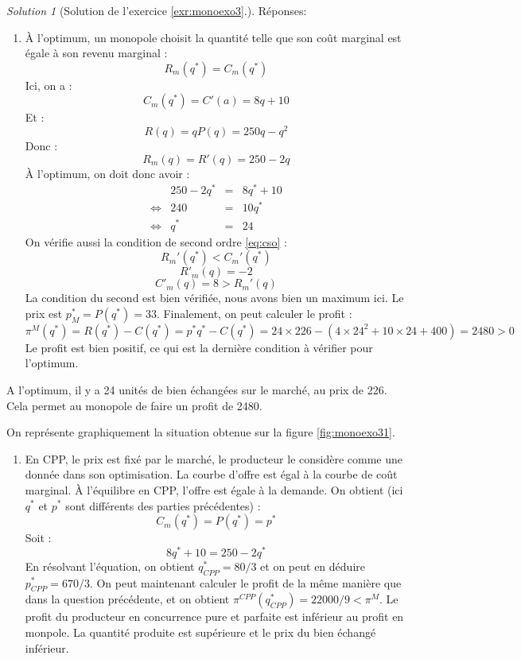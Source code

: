 \documentclass[
]{book}
\providecommand{\tightlist}{%
  \setlength{\itemsep}{0pt}\setlength{\parskip}{0pt}}
\theoremstyle{definition}
\theoremstyle{definition}
\theoremstyle{definition}
\theoremstyle{definition}
\theoremstyle{remark}
\newtheorem*{solution}{Solution}
\begin{document}
\begin{solution}[Solution de l'exercice  \ref{exr:monoexo3}.]

Réponses:

\begin{enumerate}
\def\labelenumi{\arabic{enumi}.}
\tightlist
\item
  À l'optimum, un monopole choisit la quantité telle que son coût marginal est égale à son revenu marginal :
  \[R_m(q^*)=C_m(q^*)\]
  Ici, on a :
  \[C_m(q^*)=C'(a)=8q+10\]
  Et :
  \[R(q) =qP(q)=250q-q^2\]
  Donc :
  \[R_m(q)=R'(q)=250-2q\]
  À l'optimum, on doit donc avoir :
  \[
  \begin{array}{crcl}
  &250-2q^*&=&8q^*+10\\
  \Leftrightarrow & 240&=&10q^*\\
  \Leftrightarrow & q^*&=&24
  \end{array}
  \]
  On vérifie aussi la condition de second ordre \eqref{eq:cso} :
  \[R_m'(q^*)<C_m'(q^*)\]
  \[R'_m(q)=-2\]
  \[C'_m(q)=8>R_m'(q)\]
  La condition du second est bien vérifiée, nous avons bien un maximum ici.
  Le prix est \(p^*_M=P(q^*)=33\).
  Finalement, on peut calculer le profit :
  \[
  \pi^M(q^*)=R(q^*)-C(q^*)=p^*q^*-C(q^*)=24\times226-(4\times24^2+10\times24+400)=2480>0
  \]
  Le profit est bien positif, ce qui est la dernière condition à vérifier pour l'optimum.
\end{enumerate}

A l'optimum, il y a 24 unités de bien échangées sur le marché, au prix de 226.
Cela permet au monopole de faire un profit de 2480.

On représente graphiquement la situation obtenue sur la figure \ref{fig:monoexo31}.

\begin{enumerate}
\def\labelenumi{\arabic{enumi}.}
\setcounter{enumi}{1}
\tightlist
\item
  En CPP, le prix est fixé par le marché, le producteur le considère comme une donnée dans son optimisation.
  La courbe d'offre est égal à la courbe de coût marginal.
  À l'équilibre en CPP, l'offre est égale à la demande.
  On obtient (ici \(q^*\) et \(p^*\) sont différents des parties précédentes) :
  \[C_m(q^*)=P(q^*)=p^*\]
  Soit :
  \[8q^*+10=250-2q^*\]
  En résolvant l'équation, on obtient \(q^*_{CPP}=80/3\) et on peut en déduire \(p^*_{CPP}=670/3\).
  On peut maintenant calculer le profit de la même manière que dans la question précédente, et on obtient \(\pi^{CPP}(q^*_{CPP})=22000/9<\pi^M\).
  Le profit du producteur en concurrence pure et parfaite est inférieur au profit en monpole.
  La quantité produite est supérieure et le prix du bien échangé inférieur.
\end{enumerate}


\end{solution}
\end{document}

